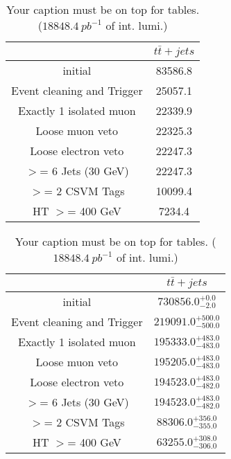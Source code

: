 \documentclass{article}
\begin{document}
\begin{table}
\caption{Your caption must be on top for tables. ($18848.4~pb^{-1}$ of int. lumi.)}
\label{tab:}
\centering
\begin{tabular}{|c|c|}
\toprule
&$t\bar{t}+jets$	\\

\midrule
initial&	83586.8	\\

Event cleaning and Trigger&	25057.1	\\

Exactly 1 isolated muon&	22339.9	\\

Loose muon veto&	22325.3	\\

Loose electron veto&	22247.3	\\

$>$= 6 Jets (30 GeV)&	22247.3	\\

$>$= 2 CSVM Tags&	10099.4	\\

HT $>$=  400 GeV&	7234.4	\\

\bottomrule
\end{tabular}
\end{table}
\begin{table}
\caption{Your caption must be on top for tables. ($18848.4~pb^{-1}$ of int. lumi.)}
\label{tab:}
\centering
\begin{tabular}{|c|c|}
\toprule
&$t\bar{t}+jets$	\\

\midrule
initial&	$730856.0^{+0.0}_{-2.0}$	\\

Event cleaning and Trigger&	$219091.0^{+500.0}_{-500.0}$	\\

Exactly 1 isolated muon&	$195333.0^{+483.0}_{-483.0}$	\\

Loose muon veto&	$195205.0^{+483.0}_{-483.0}$	\\

Loose electron veto&	$194523.0^{+483.0}_{-482.0}$	\\

$>$= 6 Jets (30 GeV)&	$194523.0^{+483.0}_{-482.0}$	\\

$>$= 2 CSVM Tags&	$88306.0^{+356.0}_{-355.0}$	\\

HT $>$=  400 GeV&	$63255.0^{+308.0}_{-306.0}$	\\

\bottomrule
\end{tabular}
\end{table}
\end{document}
